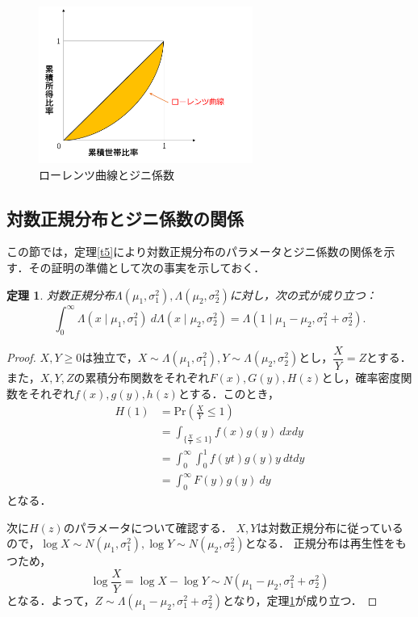 \documentclass{jsarticle}
\newtheorem{thm}[dfn]{定理}
\begin{document}
\begin{figure}[htbp]
\centering
\includegraphics[width=7cm]{figure1}
\caption{ローレンツ曲線とジニ係数}
\end{figure}


\subsection{対数正規分布とジニ係数の関係}
この節では，定理\ref{t5}により対数正規分布のパラメータとジニ係数の関係を示す．その証明の準備として次の事実を示しておく．

\begin{thm}\label{t2}
対数正規分布$\Lambda(\mu_1, \sigma_1^2), \Lambda(\mu_2, \sigma_2^2)$に対し，次の式が成り立つ：
\begin{equation}
\int_0^{\infty} \Lambda(x\mid \mu_1, \sigma_1^2)\ d\Lambda(x\mid \mu_2, \sigma_2^2)
=\Lambda(1\mid \mu_1-\mu_2, \sigma_1^2+\sigma_2^2). \label{6}
\end{equation}
\end{thm}
\begin{proof}
$X,Y\geq 0$は独立で，$X\sim \Lambda(\mu_1, \sigma_1^2), Y\sim \Lambda(\mu_2, \sigma_2^2)$とし，$\dfrac{X}{Y}=Z$とする．
また，$X,Y,Z$の累積分布関数をそれぞれ$F(x),G(y),H(z)$とし，確率密度関数をそれぞれ$f(x),g(y),h(z)$とする．このとき，
\begin{align*}
H(1) &=\mathrm{Pr}\left( \frac{X}{Y}\leq 1\right) \\
&=\int_{\{\frac{X}{Y}\leq 1\}} f(x) g(y) \ dxdy \\
&=\int_0^{\infty} \int_0^1 f(yt) g(y) y \ dtdy \\
&=\int_0^{\infty} F(y)g(y) \ dy
\end{align*}
となる．

次に$H(z)$のパラメータについて確認する．
$X,Y$は対数正規分布に従っているので，$\log X\sim N(\mu_1, \sigma_1^2), \log Y\sim N(\mu_2, \sigma_2^2) $となる．
正規分布は再生性をもつため，
\[ \log \frac{X}{Y}=\log X-\log Y \sim N(\mu_1-\mu_2, \sigma_1^2+\sigma_2^2) \]
となる．よって，$Z\sim \Lambda(\mu_1-\mu_2, \sigma_1^2+\sigma_2^2)$となり，定理\ref{t2}が成り立つ．
\end{proof}
\end{document}
